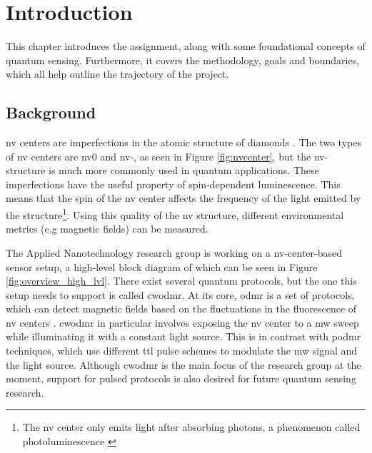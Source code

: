 \chapter{Introduction}\label{chap:intro}
This chapter introduces the assignment, along with some foundational concepts of quantum sensing. Furthermore, it covers the methodology, goals and boundaries, which all help outline the trajectory of the project.

\section{Background}\label{chap:background}
\gls{nv} centers are imperfections in the atomic structure of diamonds \cite{enwiki:1301369588}. The two types of \gls{nv} centers are \gls{nv}0 and \gls{nv}-, as seen in Figure \ref{fig:nvcenter}, but the \gls{nv}- structure is much more commonly used in quantum applications. These imperfections have the useful property of spin-dependent luminescence. This means that the spin of the \gls{nv} center affects the frequency of the light emitted by the structure\footnote{The \gls{nv} center only emits light after absorbing photons, a phenomenon called photoluminescence \cite{enwiki:1309081879}}. Using this quality of the \gls{nv} structure, different environmental metrics (e.g magnetic fields) can be measured. 

The Applied Nanotechnology research group is working on a \gls{nv}-center-based sensor setup, a high-level block diagram of which can be seen in Figure \ref{fig:overview_high_lvl}. There exist several quantum protocols, but the one this setup needs to support is called \gls{cwodmr}. At its core, \gls{odmr} is a set of protocols, which can detect magnetic fields based on the fluctuations in the fluorescence of \gls{nv} centers \cite{enwiki:1301371272}. \gls{cwodmr} in particular involves exposing the \gls{nv} center to a \gls{mw} sweep while illuminating it with a constant light source. This is in contrast with \gls{podmr} techniques, which use different \gls{ttl} pulse schemes \cite{sewani2020coherent} to modulate the \gls{mw} signal and the light source. Although \gls{cwodmr} is the main focus of the research group at the moment, support for pulsed protocols is also desired for future quantum sensing research.


